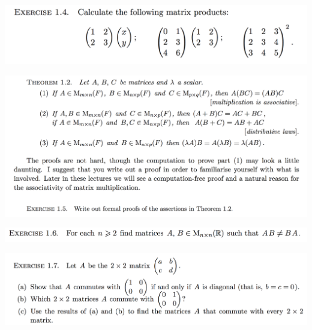 \documentclass[12pt]{article}
\begin{document}
\begin{mdframed}
\includegraphics[width=400pt]{img/oxford-prelims-M1-linear-algebra-1-4.png}
\end{mdframed}

\begin{mdframed}
\includegraphics[width=400pt]{img/oxford-prelims-M1-linear-algebra-1-5.png}
\end{mdframed}

\begin{mdframed}
\includegraphics[width=400pt]{img/oxford-prelims-M1-linear-algebra-1-6.png}
\end{mdframed}

\begin{mdframed}
\includegraphics[width=400pt]{img/oxford-prelims-M1-linear-algebra-1-7.png}
\end{mdframed}
\end{document}
